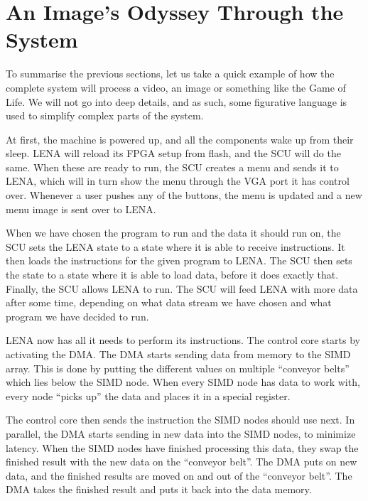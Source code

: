 \section{An Image's Odyssey Through the System}

To summarise the previous sections, let us take a quick example of how the
complete system will process a video, an image or something like the Game of
Life. We will not go into deep details, and as such, some figurative language is
used to simplify complex parts of the system.

At first, the machine is powered up, and all the components wake up from their
sleep. \ac{LENA} will reload its \ac{FPGA} setup from flash, and the \ac{SCU}
will do the same. When these are ready to run, the \ac{SCU} creates a menu and
sends it to \ac{LENA}, which will in turn show the menu through the \ac{VGA} port
it has control over. Whenever a user pushes any of the buttons, the menu is
updated and a new menu image is sent over to \ac{LENA}.

When we have chosen the program to run and the data it should run on, the
\ac{SCU} sets the \ac{LENA} state to a state where it is able to receive
instructions. It then loads the instructions for the given program to
\ac{LENA}. The \ac{SCU} then sets the state to a state where it is able to load
data, before it does exactly that. Finally, the \ac{SCU} allows \ac{LENA} to run. The
  \ac{SCU} will feed \ac{LENA} with more data after some time, depending on what
  data stream we have chosen and what program we have decided to run.



\ac{LENA} now has all it needs to perform its instructions. The control core
starts by activating the \ac{DMA}. The \ac{DMA} starts sending data from memory
to the \ac{SIMD} array. This is done by putting the different values on multiple
``conveyor belts'' which lies below the \ac{SIMD} node. When every \ac{SIMD}
node has data to work with, every node ``picks up'' the data and places it in a
special register.

The control core then sends the instruction the \ac{SIMD} nodes should use
next. In parallel, the \ac{DMA} starts sending in new data into the \ac{SIMD}
nodes, to minimize latency. When the \ac{SIMD} nodes have finished processing
this data, they swap the finished result with the new data on the ``conveyor
belt''. The \ac{DMA} puts on new data, and the finished results are moved on and
out of the ``conveyor belt''. The \ac{DMA} takes the finished result and puts it
back into the data memory.

